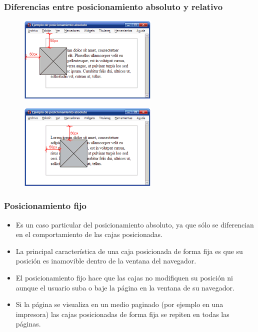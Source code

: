 \begin{frame}
\frametitle{Diferencias entre posicionamiento absoluto y relativo}

\begin{center}
\begin{figure}[p]
\includegraphics[width=0.6\textwidth]{figs/f0519.png}
\end{figure}
\end{center}

\begin{center}
\begin{figure}[p]
\includegraphics[width=0.6\textwidth]{figs/f0521.png}
\end{figure}
\end{center}

\end{frame}



\begin{frame}
\frametitle{Posicionamiento fijo}

\begin{itemize}
  \item Es un caso particular del posicionamiento absoluto, ya que sólo se diferencian en el comportamiento de las cajas posicionadas.
  \item La principal característica de una caja posicionada de forma fija es que su posición es inamovible dentro de la ventana del navegador.
  \item El posicionamiento fijo hace que las cajas no modifiquen su posición ni aunque el usuario suba o baje la página en la ventana de su navegador.
  \item Si la página se visualiza en un medio paginado (por ejemplo en una impresora) las cajas posicionadas de forma fija se repiten en todas las páginas.
\end{itemize}

\end{frame}


